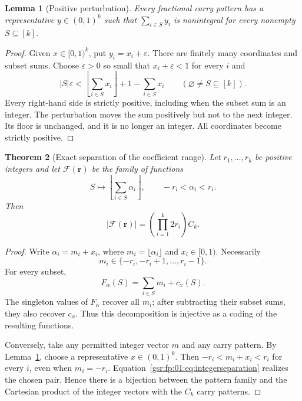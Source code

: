 \documentclass[11pt,letterpaper]{article}
\numberwithin{equation}{section}
\newtheorem{theorem}{Theorem}[section]
\newtheorem{lemma}[theorem]{Lemma}
\theoremstyle{definition}
\theoremstyle{remark}
\newcommand{\1}{\mathbf 1}
\newcommand{\floor}[1]{\left\lfloor#1\right\rfloor}
\begin{document}
\begin{lemma}[Positive perturbation]\label{gsr:fp:01:lem:perturb}
Every fractional carry pattern has a representative $y\in(0,1)^k$ such
that $\sum_{i\in S}y_i$ is nonintegral for every nonempty $S\subseteq[k]$.
\end{lemma}
\begin{proof}
Given $x\in[0,1)^k$, put $y_i=x_i+\varepsilon$. There are finitely many
coordinates and subset sums. Choose $\varepsilon>0$ so small that
$x_i+\varepsilon<1$ for every $i$ and
\[
 |S|\varepsilon<
  \floor{\sum_{i\in S}x_i}+1-\sum_{i\in S}x_i
 \qquad(\varnothing\ne S\subseteq[k]).
\]
Every right-hand side is strictly positive, including when the subset
sum is an integer. The perturbation moves the sum positively but not to
the next integer. Its floor is unchanged, and it is no longer an integer.
All coordinates become strictly positive.
\end{proof}

\begin{theorem}[Exact separation of the coefficient range]\label{gsr:fp:01:thm:range}
Let $r_1,\ldots,r_k$ be positive integers and let $\mathcal F(\mathbf r)$
be the family of functions
\[
 S\longmapsto\floor{\sum_{i\in S}\alpha_i},\qquad
                 -r_i<\alpha_i<r_i.
\]
Then
\begin{equation}\label{gsr:fp:01:eq:rangeexact}
 |\mathcal F(\mathbf r)|=\left(\prod_{i=1}^k2r_i\right)C_k.
\end{equation}
\end{theorem}
\begin{proof}
Write $\alpha_i=m_i+x_i$, where $m_i=\lfloor\alpha_i\rfloor$ and
$x_i\in[0,1)$. Necessarily
\[
 m_i\in\{-r_i,-r_i+1,\ldots,r_i-1\}.
\]
For every subset,
\begin{equation}\label{gsr:fp:01:eq:integerseparation}
 F_\alpha(S)=\sum_{i\in S}m_i+c_x(S).
\end{equation}
The singleton values of $F_\alpha$ recover all $m_i$; after subtracting
their subset sums, they also recover $c_x$. Thus this decomposition is
injective as a coding of the resulting functions.

Conversely, take any permitted integer vector $m$ and any carry pattern.
By Lemma~\ref{gsr:fp:01:lem:perturb}, choose a representative $x\in(0,1)^k$.
Then $-r_i<m_i+x_i<r_i$ for every $i$, even when $m_i=-r_i$.
Equation~\eqref{gsr:fp:01:eq:integerseparation} realizes the chosen pair. Hence
there is a bijection between the pattern family and the Cartesian product
of the integer vectors with the $C_k$ carry patterns.
\end{proof}
\end{document}

